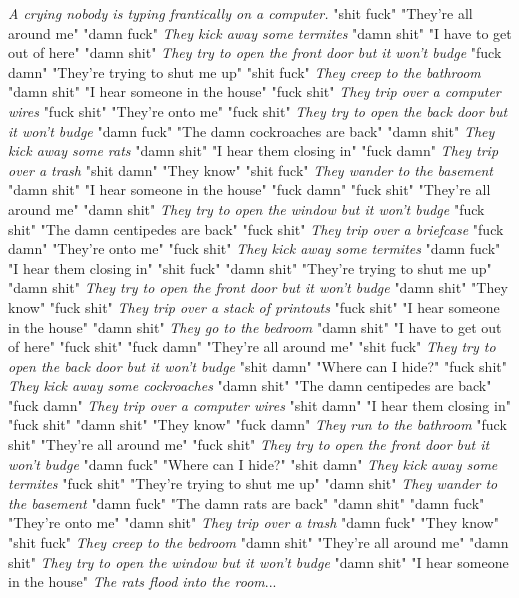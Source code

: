 \documentclass{report}
\begin{document}
\textit{A crying nobody is typing frantically on a computer.} "shit fuck" "They're all around me" "damn fuck" \textit{They kick away some termites} "damn shit" "I have to get out of here" "damn shit" \textit{They try to open the front door but it won't budge} "fuck damn" "They're trying to shut me up" "shit fuck" \textit{They creep to the bathroom} "damn shit" "I hear someone in the house" "fuck shit" \textit{They trip over a computer wires} "fuck shit" "They're onto me" "fuck shit" \textit{They try to open the back door but it won't budge} "damn fuck" "The damn cockroaches are back" "damn shit" \textit{They kick away some rats} "damn shit" "I hear them closing in" "fuck damn" \textit{They trip over a trash} "shit damn" "They know" "shit fuck" \textit{They wander to the basement} "damn shit" "I hear someone in the house" "fuck damn" \textit{} "fuck shit" "They're all around me" "damn shit" \textit{They try to open the window but it won't budge} "fuck shit" "The damn centipedes are back" "fuck shit" \textit{They trip over a briefcase} "fuck damn" "They're onto me" "fuck shit" \textit{They kick away some termites} "damn fuck" "I hear them closing in" "shit fuck" \textit{} "damn shit" "They're trying to shut me up" "damn shit" \textit{They try to open the front door but it won't budge} "damn shit" "They know" "fuck shit" \textit{They trip over a stack of printouts} "fuck shit" "I hear someone in the house" "damn shit" \textit{They go to the bedroom} "damn shit" "I have to get out of here" "fuck shit" \textit{} "fuck damn" "They're all around me" "shit fuck" \textit{They try to open the back door but it won't budge} "shit damn" "Where can I hide?" "fuck shit" \textit{They kick away some cockroaches} "damn shit" "The damn centipedes are back" "fuck damn" \textit{They trip over a computer wires} "shit damn" "I hear them closing in" "fuck shit" \textit{} "damn shit" "They know" "fuck damn" \textit{They run to the bathroom} "fuck shit" "They're all around me" "fuck shit" \textit{They try to open the front door but it won't budge} "damn fuck" "Where can I hide?" "shit damn" \textit{They kick away some termites} "fuck shit" "They're trying to shut me up" "damn shit" \textit{They wander to the basement} "damn fuck" "The damn rats are back" "damn shit" \textit{} "damn fuck" "They're onto me" "damn shit" \textit{They trip over a trash} "damn fuck" "They know" "shit fuck" \textit{They creep to the bedroom} "damn shit" "They're all around me" "damn shit" \textit{They try to open the window but it won't budge} "damn shit" "I hear someone in the house" \textit{The rats flood into the room}...
\end{document}
